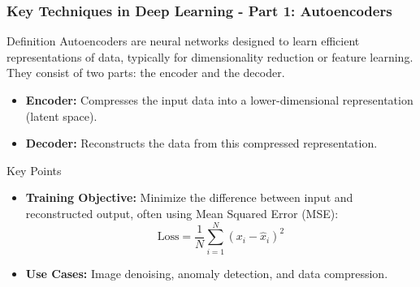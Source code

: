\documentclass[aspectratio=169]{beamer}
\begin{document}
\begin{frame}[fragile]
    \frametitle{Key Techniques in Deep Learning - Part 1: Autoencoders}
    \begin{block}{Definition}
        Autoencoders are neural networks designed to learn efficient representations of data, typically for dimensionality reduction or feature learning. They consist of two parts: the encoder and the decoder.
    \end{block}
    
    \begin{itemize}
        \item \textbf{Encoder:} Compresses the input data into a lower-dimensional representation (latent space).
        \item \textbf{Decoder:} Reconstructs the data from this compressed representation.
    \end{itemize}
    
    \begin{block}{Key Points}
        \begin{itemize}
            \item \textbf{Training Objective:} Minimize the difference between input and reconstructed output, often using Mean Squared Error (MSE):
            \begin{equation}
                \text{Loss} = \frac{1}{N} \sum_{i=1}^{N} (x_i - \hat{x}_i)^2
            \end{equation}
            \item \textbf{Use Cases:} Image denoising, anomaly detection, and data compression.
        \end{itemize}
    \end{block}
\end{frame}
\end{document}

